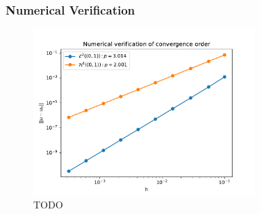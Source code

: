 \subsubsection{Numerical Verification}


\begin{figure}[!h]
  \centering
  \includegraphics[width=0.75\textwidth]{Images/plots/task1_conv_plot.pdf}
  \caption{TODO}
  \label{fig:conv_plot}
\end{figure}

